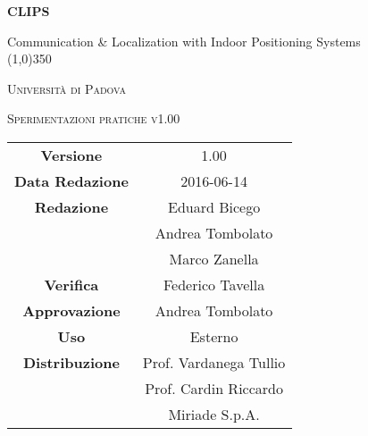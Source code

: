 \documentclass[a4paper,12pt]{article}
\author{}
\date{9/12/2015}
\begin{document}
	\begin{titlepage}
		\centering
		{\huge\bfseries CLIPS\par}
	Communication \& Localization with Indoor Positioning Systems \\
	\line(1,0){350} \\
	{\scshape\LARGE Università di Padova \par}
	\vspace{1cm}
	{\scshape\Large Sperimentazioni pratiche v1.00\par}
	\logo
	\newpage
		\begin{tabular}{c|c}
			{\hfill \textbf{Versione}} 		& 1.00				\\
			{\hfill\textbf{Data Redazione}} 	& 2016-06-14	  		\\
			{\hfill\textbf{Redazione}}		& Eduard Bicego \\
											& Andrea Tombolato  \\
											& Marco Zanella		\\
			{\hfill\textbf{Verifica}} 		& Federico Tavella		\\
			{\hfill\textbf{Approvazione}} 		& Andrea Tombolato		\\
			{\hfill\textbf{Uso}} 			& Esterno			\\
			{\hfill\textbf{Distribuzione}} 		& Prof. Vardanega Tullio 	\\
								& Prof. Cardin Riccardo 	\\
								& Miriade S.p.A. 		\\
		\end{tabular}
	\end{titlepage}
	\newpage
		\pagestyle{myfront}
		

	\newpage
		\tableofcontents
	\newpage
		\listoftables
	\newpage
		\listoffigures
	\label{LastFrontPage}

	\newpage
	\pagestyle{mymain}
				
		
	\newpage
		
		
	\newpage
		
		
	\newpage
				
		
	\newpage
		
		
	
	\newpage
		
		
	\newpage
		
		
	\label{LastPage}
\end{document}

